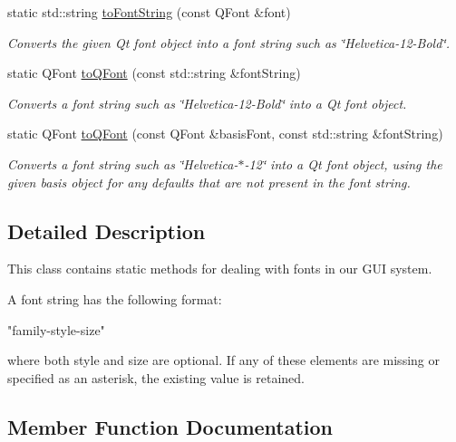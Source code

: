 \begin{DoxyCompactItemize}
static std\+::string \mbox{\hyperlink{classGFont_a1e897239fcf0fa78a33f3021a98b0029}{to\+Font\+String}} (const Q\+Font \&font)
\begin{DoxyCompactList}\small\item\em Converts the given Qt font object into a font string such as \char`\"{}\+Helvetica-\/12-\/\+Bold\char`\"{}. \end{DoxyCompactList}\item 
static Q\+Font \mbox{\hyperlink{classGFont_aea0f70979b631219291103391bfacc6e}{to\+Q\+Font}} (const std\+::string \&font\+String)
\begin{DoxyCompactList}\small\item\em Converts a font string such as \char`\"{}\+Helvetica-\/12-\/\+Bold\char`\"{} into a Qt font object. \end{DoxyCompactList}\item 
static Q\+Font \mbox{\hyperlink{classGFont_a7eea6ca714d168dc53c86124bb4fc387}{to\+Q\+Font}} (const Q\+Font \&basis\+Font, const std\+::string \&font\+String)
\begin{DoxyCompactList}\small\item\em Converts a font string such as \char`\"{}\+Helvetica-\/$\ast$-\/12\char`\"{} into a Qt font object, using the given \textquotesingle{}basis\textquotesingle{} object for any defaults that are not present in the font string. \end{DoxyCompactList}\end{DoxyCompactItemize}


\subsection{Detailed Description}
This class contains static methods for dealing with fonts in our G\+UI system. 

A font string has the following format\+:


\begin{DoxyPre}
"family-style-size"
\end{DoxyPre}


where both {\ttfamily style} and {\ttfamily size} are optional. If any of these elements are missing or specified as an asterisk, the existing value is retained. 

\subsection{Member Function Documentation}
\mbox{\label{classGFont_ae709c4560c613217490269d4df94602c}} 
